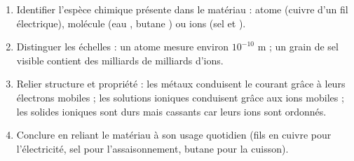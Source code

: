 \documentclass[11pt]{article}
\newcommand{\cle}[1]{{\popxbold\color{popdark}#1}}
\begin{document}
\begin{methode}
\begin{enumerate}
\item \cle{Identifier l'espèce chimique} présente dans le matériau : atome (cuivre  d'un fil électrique), molécule (eau , butane ) ou ions (sel  et ).
\item \cle{Distinguer les échelles} : un atome mesure environ $10^{-10}$ m ; un grain de sel visible contient des milliards de milliards d'ions.
\item \cle{Relier structure et propriété} : les métaux conduisent le courant grâce à leurs électrons mobiles ; les solutions ioniques conduisent grâce aux ions mobiles ; les solides ioniques sont durs mais cassants car leurs ions sont ordonnés.
\item \cle{Conclure} en reliant le matériau à son usage quotidien (fils en cuivre pour l'électricité, sel pour l'assaisonnement, butane pour la cuisson).
\end{enumerate}
\end{methode}
\end{document}
